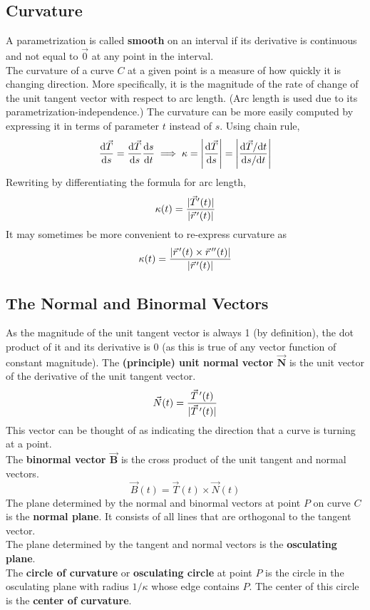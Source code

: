 \documentclass[../Calculus_\Roman{3}]{subfiles}
\begin{document}
			\subsection*{Curvature}
				A parametrization is called \textbf{smooth} on an interval if its derivative is continuous and not equal to $\vec{0}$ at any point in the interval. \\
				The curvature of a curve $C$ at a given point is a measure of how quickly it is changing direction. More specifically, it is the magnitude of the rate of change of the unit tangent vector with respect to arc length. (Arc length is used due to its parametrization-independence.)
				The curvature can be more easily computed by expressing it in terms of parameter $t$ instead of $s$. Using chain rule, 
					\[
						\frac{\mathrm{d} \vec{T}}{\mathrm{d} s} = \frac{\mathrm{d} \vec{T}}{\mathrm{d} s}\frac{\mathrm{d} s}{\mathrm{d} t}
							\implies \kappa
							= \left|\frac{\mathrm{d} \vec{T}}{\mathrm{d} s}\right|
							= \left|{\frac{\mathrm{d} \vec{T} / \mathrm{d} t}{\mathrm{d} s / \mathrm{d} t}}\right|
					\]
				Rewriting by differentiating the formula for arc length, 
					\[\kappa(t) = \frac{|\vec{T}'(t)|}{|\vec{r}\hspace{0.5mm}'(t)|}\]
				It may sometimes be more convenient to re-express curvature as
					\[\kappa(t) = \frac{|\vec{r}\hspace{0.5mm}'(t) \times \vec{r}\hspace{0.5mm}''(t)|}{|\vec{r}\hspace{0.5mm}'(t)|}\]
			\subsection*{The Normal and Binormal Vectors}
				As the magnitude of the unit tangent vector is always 1 (by definition), the dot product of it and its derivative is 0 (as this is true of any vector function of constant magnitude). The \textbf{(principle) unit normal vector $\bm{\vec{N}}$} is the unit vector of the derivative of the unit tangent vector.
					\[\vec{N}(t) = \frac{\vec{T}\hspace{0.5mm}'(t)}{|\vec{T}\hspace{0.5mm}'(t)|}\]
				This vector can be thought of as indicating the direction that a curve is turning at a point. \\
				The \textbf{binormal vector $\bm{\vec{B}}$} is the cross product of the unit tangent and normal vectors.
					\[\vec{B}(t) = \vec{T}(t) \times \vec{N}(t)\]
				The plane determined by the normal and binormal vectors at point $P$ on curve $C$ is the \textbf{normal plane}. It consists of all lines that are orthogonal to the tangent vector. \\
				The plane determined by the tangent and normal vectors is the \textbf{osculating plane}. \\
				The \textbf{circle of curvature} or \textbf{osculating circle} at point $P$ is the circle in the osculating plane with radius $1/\kappa$ whose edge contains $P$. The center of this circle is the \textbf{center of curvature}.
\end{document}
